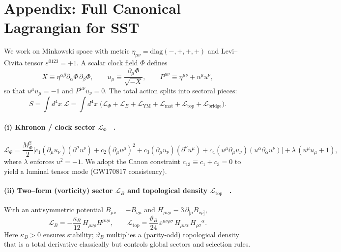 \documentclass[10pt,reprint,aps,onecolumn,nofootinbib]{revtex4-2}
\begin{document}
    \appendix

\section{Appendix: Full Canonical Lagrangian for SST}
\label{app:fullL}

We work on Minkowski space with metric \(\eta_{\mu\nu}=\mathrm{diag}(-,+,+,+)\) and Levi–Civita tensor \(\varepsilon^{0123}=+1\).
A scalar clock field \(\Phi\) defines
\[
    X \equiv \eta^{\alpha\beta}\partial_\alpha\Phi\,\partial_\beta\Phi,\qquad
    u_\mu \equiv \frac{\partial_\mu\Phi}{\sqrt{-X}},\qquad
    P^{\mu\nu} \equiv \eta^{\mu\nu}+u^\mu u^\nu,
\]
so that \(u^\mu u_\mu=-1\) and \(P^{\mu\nu}u_\nu=0\).
The total action splits into sectoral pieces:
\begin{equation}
S=\int d^4x\;\mathcal{L}
=\int d^4x\;\Big(
\mathcal{L}_\Phi
+\mathcal{L}_B
+\mathcal{L}_{\mathrm{YM}}
+\mathcal{L}_{\mathrm{mat}}
+\mathcal{L}_{\mathrm{top}}
+\mathcal{L}_{\mathrm{bridge}}
\Big).
\label{eq:S_total_app}
\end{equation}

\paragraph*{(i) Khronon / clock sector \(\mathcal{L}_\Phi\)~ \cite{sstLagrangian}.}
    \begin{equation}
    \mathcal{L}_\Phi
    =\frac{M_\Phi^2}{2}\Big[
        c_1(\partial_\mu u_\nu)(\partial^\mu u^\nu)
        +c_2(\partial_\mu u^\mu)^2
        +c_3(\partial_\mu u_\nu)(\partial^\nu u^\mu)
        +c_4(u^\mu\partial_\mu u_\nu)(u^\alpha\partial_\alpha u^\nu)
        \Big]
    +\lambda\,(u^\mu u_\mu+1),
    \label{eq:Lphi_app}
    \end{equation}
    where \(\lambda\) enforces \(u^2=-1\). We adopt the Canon constraint \(c_{13}\equiv c_1+c_3=0\) to yield a luminal tensor mode (GW170817 consistency).

\paragraph*{(ii) Two–form (vorticity) sector \(\mathcal{L}_B\) and topological density \(\mathcal{L}_{\mathrm{top}}\)~ \cite{sstLagrangian}.}
    With an antisymmetric potential \(B_{\mu\nu}=-B_{\nu\mu}\) and \(H_{\mu\nu\rho}\equiv 3\,\partial_{[\mu}B_{\nu\rho]}\),
    \begin{equation}
    \mathcal{L}_B
    =-\frac{\kappa_B}{12}\,H_{\mu\nu\rho}H^{\mu\nu\rho},
    \qquad
    \mathcal{L}_{\mathrm{top}}
    =\frac{\vartheta_B}{24}\,
    \varepsilon^{\mu\nu\rho\sigma}\,
    H_{\mu\nu\alpha}\,H_{\rho\sigma}{}^{\alpha}.
    \label{eq:LB_app}
    \end{equation}
    Here \(\kappa_B>0\) ensures stability; \(\vartheta_B\) multiplies a (parity-odd) topological density that is a total derivative classically but controls global sectors and selection rules.
\end{document}
